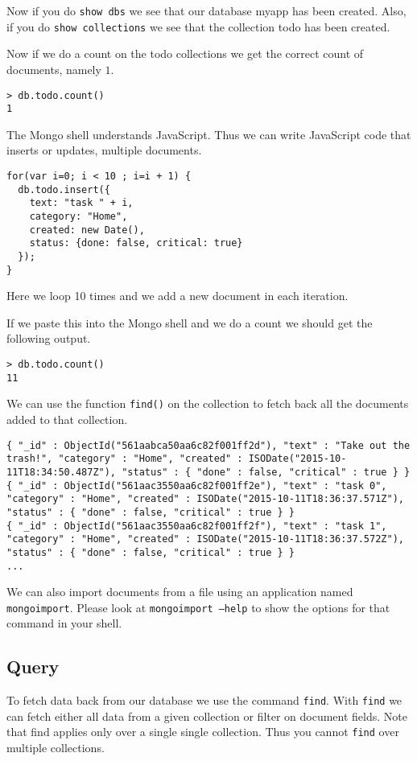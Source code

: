Now if you do \texttt{show dbs} we see that our database myapp has been created. Also, if you do \texttt{show collections} we see that the collection todo has been created.

Now if we do a count on the todo collections we get the correct count of documents, namely $1$.

\begin{lstlisting}
> db.todo.count()
1
\end{lstlisting}

The Mongo shell understands JavaScript. Thus we can write JavaScript code that inserts or updates, multiple documents.

\begin{lstlisting}
for(var i=0; i < 10 ; i=i + 1) {
  db.todo.insert({
    text: "task " + i,
    category: "Home",
    created: new Date(),
    status: {done: false, critical: true}
  });
}
\end{lstlisting}

Here we loop 10 times and we add a new document in each iteration.

If we paste this into the Mongo shell and we do a count we should get the following output.

\begin{lstlisting}
> db.todo.count()
11
\end{lstlisting}

We can use the function \texttt{find()} on the collection to fetch back all the documents added to that collection.

\begin{lstlisting}
{ "_id" : ObjectId("561aabca50aa6c82f001ff2d"), "text" : "Take out the trash!", "category" : "Home", "created" : ISODate("2015-10-11T18:34:50.487Z"), "status" : { "done" : false, "critical" : true } }
{ "_id" : ObjectId("561aac3550aa6c82f001ff2e"), "text" : "task 0", "category" : "Home", "created" : ISODate("2015-10-11T18:36:37.571Z"), "status" : { "done" : false, "critical" : true } }
{ "_id" : ObjectId("561aac3550aa6c82f001ff2f"), "text" : "task 1", "category" : "Home", "created" : ISODate("2015-10-11T18:36:37.572Z"), "status" : { "done" : false, "critical" : true } }
...
\end{lstlisting}

We can also import documents from a file using an application named \texttt{mongoimport}. Please look at \texttt{mongoimport --help} to show the options for that command in your shell.


\subsection{Query}
To fetch data back from our database we use the command \texttt{find}. With \texttt{find} we can fetch either all data from a given collection or filter on document fields. Note that find applies only over a single single collection. Thus you cannot \texttt{find} over multiple collections.

